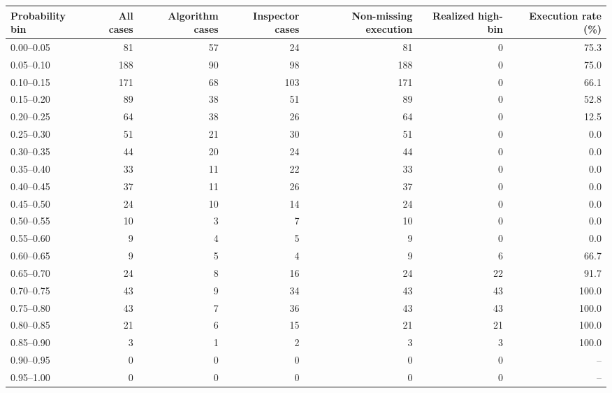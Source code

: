 \begin{tabular}[t]{lrrrrrr}
\toprule
Probability bin & All cases & Algorithm cases & Inspector cases & Non-missing execution & Realized high-bin & Execution rate (\%)\\
\midrule
0.00--0.05 & 81 & 57 & 24 & 81 & 0 & 75.3\\
0.05--0.10 & 188 & 90 & 98 & 188 & 0 & 75.0\\
0.10--0.15 & 171 & 68 & 103 & 171 & 0 & 66.1\\
0.15--0.20 & 89 & 38 & 51 & 89 & 0 & 52.8\\
0.20--0.25 & 64 & 38 & 26 & 64 & 0 & 12.5\\
0.25--0.30 & 51 & 21 & 30 & 51 & 0 & 0.0\\
0.30--0.35 & 44 & 20 & 24 & 44 & 0 & 0.0\\
0.35--0.40 & 33 & 11 & 22 & 33 & 0 & 0.0\\
0.40--0.45 & 37 & 11 & 26 & 37 & 0 & 0.0\\
0.45--0.50 & 24 & 10 & 14 & 24 & 0 & 0.0\\
0.50--0.55 & 10 & 3 & 7 & 10 & 0 & 0.0\\
0.55--0.60 & 9 & 4 & 5 & 9 & 0 & 0.0\\
0.60--0.65 & 9 & 5 & 4 & 9 & 6 & 66.7\\
0.65--0.70 & 24 & 8 & 16 & 24 & 22 & 91.7\\
0.70--0.75 & 43 & 9 & 34 & 43 & 43 & 100.0\\
0.75--0.80 & 43 & 7 & 36 & 43 & 43 & 100.0\\
0.80--0.85 & 21 & 6 & 15 & 21 & 21 & 100.0\\
0.85--0.90 & 3 & 1 & 2 & 3 & 3 & 100.0\\
0.90--0.95 & 0 & 0 & 0 & 0 & 0 & --\\
0.95--1.00 & 0 & 0 & 0 & 0 & 0 & --\\
\bottomrule
\end{tabular}
